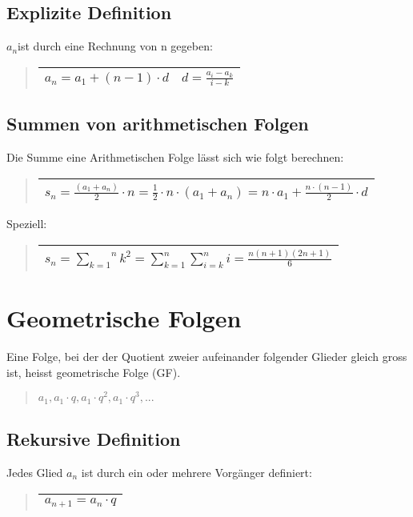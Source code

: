 \subsection*{Explizite Definition}

$a_{n}$ist durch eine Rechnung von n gegeben:
\begin{quote}
\begin{tabular}{|c|c|}
\hline 
$a_{n}=a_{1}+(n-1)\cdot d$ & $d=\frac{a_{i}-a_{k}}{i-k}$\tabularnewline
\hline 
\end{tabular}
\end{quote}

\subsection*{Summen von arithmetischen Folgen}

Die Summe eine Arithmetischen Folge lässt sich wie folgt berechnen:
\begin{verse}
\begin{tabular}{|c|}
\hline 
$s_{n}=\frac{(a_{1}+a_{n})}{2}\cdot n=\frac{1}{2}\cdot n\cdot(a_{1}+a_{n})=n\cdot a_{1}+\frac{n\cdot(n-1)}{2}\cdot d$\tabularnewline
\hline 
\end{tabular}
\end{verse}
Speziell:
\begin{verse}
\begin{tabular}{|c|}
\hline 
$s_{n}=\overset{n}{\underset{k=1}{\sum}}k^{2}=\sum_{k=1}^{n}\sum_{i=k}^{n}i=\frac{n(n+1)(2n+1)}{6}$\tabularnewline
\hline 
\end{tabular}
\end{verse}

\section*{Geometrische Folgen}

Eine Folge, bei der der Quotient zweier aufeinander folgender Glieder
gleich gross ist, heisst geometrische Folge (GF).
\begin{verse}
$a_{1},a_{1}\cdot q,a_{1}\cdot q^{2},a_{1}\cdot q^{3},...$
\end{verse}

\subsection*{Rekursive Definition}

Jedes Glied $a_{n}$ ist durch ein oder mehrere Vorgänger definiert:
\begin{verse}
\begin{tabular}{|c|}
\hline 
$a_{n+1}=a_{n}\cdot q$\tabularnewline
\hline 
\end{tabular}
\end{verse}

